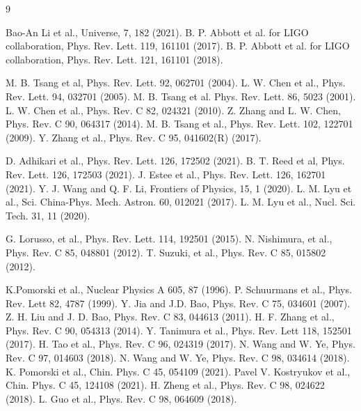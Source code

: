 \documentclass[submitting]{nst}
\begin{document}
\begin{thebibliography} {9}



 Bao-An Li et al., Universe, 7, 182 (2021). 
 B. P. Abbott et al. for LIGO collaboration, Phys. Rev. Lett. 119, 161101 (2017).
 B. P. Abbott et al. for LIGO collaboration, Phys. Rev. Lett. 121, 161101 (2018).

 M. B. Tsang et al, Phys. Rev. Lett.  92, 062701 (2004).
 L. W. Chen et al., Phys. Rev. Lett. 94, 032701 (2005).
 M. B. Tsang  et al. Phys. Rev. Lett.  86, 5023 (2001).
 L. W. Chen et al., Phys. Rev. C 82, 024321 (2010). 
  Z. Zhang and L. W. Chen, Phys. Rev. C  90, 064317 (2014).
 M. B. Tsang et al.,  Phys. Rev. Lett. 102, 122701  (2009).
 Y. Zhang et al., Phys. Rev. C 95, 041602(R) (2017).

 D. Adhikari et al.,  Phys. Rev. Lett. 126, 172502 (2021).
 B. T. Reed et al,   Phys. Rev. Lett. 126, 172503 (2021).
 J. Estee et al.,   Phys. Rev. Lett. 126, 162701 (2021).
 Y. J. Wang and Q. F. Li, Frontiers of Physics, 15, 1 (2020).
 L. M. Lyu et al., Sci. China-Phys. Mech. Astron. 60, 012021 (2017).
L. M. Lyu et al., Nucl. Sci. Tech. 31, 11 (2020).

 G. Lorusso, et al., Phys. Rev. Lett. 114,  192501 (2015).
 N. Nishimura, et al., Phys. Rev. C 85, 048801 (2012).
 T. Suzuki, et al., Phys. Rev. C 85, 015802 (2012).


 K.Pomorski et al., Nuclear Physics A 605, 87 (1996).
 P. Schuurmans et al., Phys. Rev. Lett 82, 4787 (1999).
 Y. Jia and J.D. Bao,  Phys. Rev. C 75, 034601 (2007).
 Z. H. Liu and J. D. Bao, Phys. Rev. C 83, 044613 (2011).
 H. F. Zhang et al., Phys. Rev. C 90, 054313 (2014).
 Y. Tanimura et al., Phys. Rev. Lett 118, 152501 (2017).
 H. Tao et al., Phys. Rev. C 96, 024319 (2017).
 N. Wang and W. Ye,  Phys. Rev. C 97, 014603 (2018).
 N. Wang and W. Ye, Phys. Rev. C 98, 034614 (2018).
 K. Pomorski et al., Chin. Phys. C 45, 054109 (2021). 
 Pavel V. Kostryukov et al., Chin. Phys. C 45, 124108 (2021).
 H. Zheng et al., Phys. Rev.  C 98, 024622 (2018).
 L. Guo et al.,   Phys. Rev. C  98, 064609 (2018).



\end{thebibliography}
\end{document}
